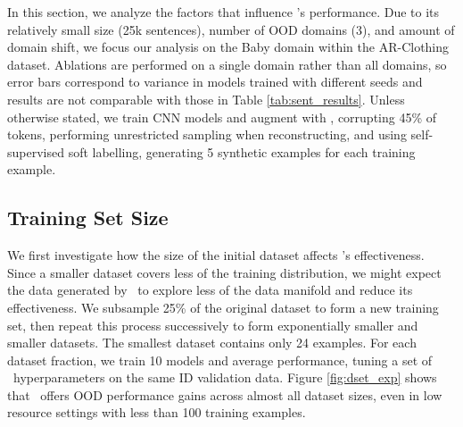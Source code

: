 In this section, we analyze the factors that influence \ssmba's performance.
Due to its relatively small size (25k sentences), number of OOD domains (3), and amount of domain shift, we focus our analysis on the Baby domain within the AR-Clothing dataset.
Ablations are performed on a single domain rather than all domains, so error bars correspond to variance in models trained with different seeds and results are not comparable with those in Table \ref{tab:sent_results}.
Unless otherwise stated, we train CNN models and augment with \ssmba, corrupting 45\% of tokens, performing unrestricted sampling when reconstructing, and using self-supervised soft labelling, generating 5 synthetic examples for each training example. 

\subsection{Training Set Size}
\label{subsec:dsize_exp}
We first investigate how the size of the initial dataset affects \ssmba's effectiveness.
Since a smaller dataset covers less of the training distribution, we might expect the data generated by \ssmba\ to explore less of the data manifold and reduce its effectiveness.
We subsample 25\% of the original dataset to form a new training set, then repeat this process successively to form exponentially smaller and smaller datasets. 
The smallest dataset contains only 24 examples.
For each dataset fraction, we train 10 models and average performance,
tuning a set of \ssmba\ hyperparameters on the same ID validation data.
Figure \ref{fig:dset_exp} shows that \ssmba\ offers OOD performance gains across almost all dataset sizes, even in low resource settings with less than 100 training examples.

